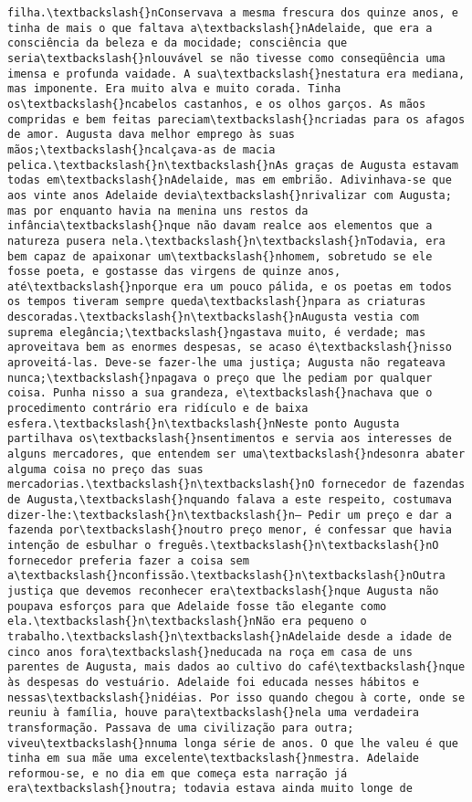 \begin{Verbatim}[commandchars=\\\{\}]
filha.\textbackslash{}nConservava a mesma frescura dos quinze anos, e tinha de mais o que faltava a\textbackslash{}nAdelaide, que era a consciência da beleza e da mocidade; consciência que seria\textbackslash{}nlouvável se não tivesse como conseqüência uma imensa e profunda vaidade. A sua\textbackslash{}nestatura era mediana, mas imponente. Era muito alva e muito corada. Tinha os\textbackslash{}ncabelos castanhos, e os olhos garços. As mãos compridas e bem feitas pareciam\textbackslash{}ncriadas para os afagos de amor. Augusta dava melhor emprego às suas mãos;\textbackslash{}ncalçava-as de macia pelica.\textbackslash{}n\textbackslash{}nAs graças de Augusta estavam todas em\textbackslash{}nAdelaide, mas em embrião. Adivinhava-se que aos vinte anos Adelaide devia\textbackslash{}nrivalizar com Augusta; mas por enquanto havia na menina uns restos da infância\textbackslash{}nque não davam realce aos elementos que a natureza pusera nela.\textbackslash{}n\textbackslash{}nTodavia, era bem capaz de apaixonar um\textbackslash{}nhomem, sobretudo se ele fosse poeta, e gostasse das virgens de quinze anos, até\textbackslash{}nporque era um pouco pálida, e os poetas em todos os tempos tiveram sempre queda\textbackslash{}npara as criaturas descoradas.\textbackslash{}n\textbackslash{}nAugusta vestia com suprema elegância;\textbackslash{}ngastava muito, é verdade; mas aproveitava bem as enormes despesas, se acaso é\textbackslash{}nisso aproveitá-las. Deve-se fazer-lhe uma justiça; Augusta não regateava nunca;\textbackslash{}npagava o preço que lhe pediam por qualquer coisa. Punha nisso a sua grandeza, e\textbackslash{}nachava que o procedimento contrário era ridículo e de baixa esfera.\textbackslash{}n\textbackslash{}nNeste ponto Augusta partilhava os\textbackslash{}nsentimentos e servia aos interesses de alguns mercadores, que entendem ser uma\textbackslash{}ndesonra abater alguma coisa no preço das suas mercadorias.\textbackslash{}n\textbackslash{}nO fornecedor de fazendas de Augusta,\textbackslash{}nquando falava a este respeito, costumava dizer-lhe:\textbackslash{}n\textbackslash{}n— Pedir um preço e dar a fazenda por\textbackslash{}noutro preço menor, é confessar que havia intenção de esbulhar o freguês.\textbackslash{}n\textbackslash{}nO fornecedor preferia fazer a coisa sem a\textbackslash{}nconfissão.\textbackslash{}n\textbackslash{}nOutra justiça que devemos reconhecer era\textbackslash{}nque Augusta não poupava esforços para que Adelaide fosse tão elegante como ela.\textbackslash{}n\textbackslash{}nNão era pequeno o trabalho.\textbackslash{}n\textbackslash{}nAdelaide desde a idade de cinco anos fora\textbackslash{}neducada na roça em casa de uns parentes de Augusta, mais dados ao cultivo do café\textbackslash{}nque às despesas do vestuário. Adelaide foi educada nesses hábitos e nessas\textbackslash{}nidéias. Por isso quando chegou à corte, onde se reuniu à família, houve para\textbackslash{}nela uma verdadeira transformação. Passava de uma civilização para outra; viveu\textbackslash{}nnuma longa série de anos. O que lhe valeu é que tinha em sua mãe uma excelente\textbackslash{}nmestra. Adelaide reformou-se, e no dia em que começa esta narração já era\textbackslash{}noutra; todavia estava ainda muito longe de 
\end{Verbatim}
